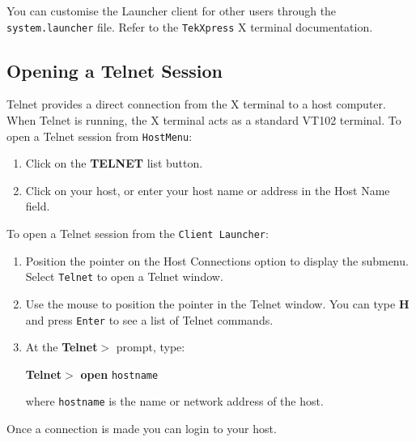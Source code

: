 You can customise the Launcher client for other users through the
{\tt system.launcher} file. Refer to the {\tt TekXpress} X terminal
documentation.

\clearpage

\subsection {Opening a Telnet Session}

Telnet provides a direct connection from the X terminal to a host computer.
When Telnet is running, the X terminal acts as a standard VT102 terminal. To
open a Telnet session from {\tt HostMenu}:

\begin {enumerate}

\item Click on the {\bf TELNET} list button.

\item Click on your host, or enter your host name or address in the Host Name
field.

\end {enumerate}

To open a Telnet session from the {\tt Client Launcher}:

\begin {enumerate}

\item Position the pointer on the Host Connections option to display the
submenu. Select {\tt Telnet} to open a Telnet window.

\item Use the mouse to position the pointer in the Telnet window. You can type
{\bf H} and press {\tt Enter} to see a list of Telnet commands.

\item At the {\bf Telnet$>$} prompt, type:

{\bf Telnet$>$} {\bf open} {\tt hostname}

where {\tt hostname} is the name or network address of the host.

\end {enumerate}

Once a connection is made you can login to your host.

